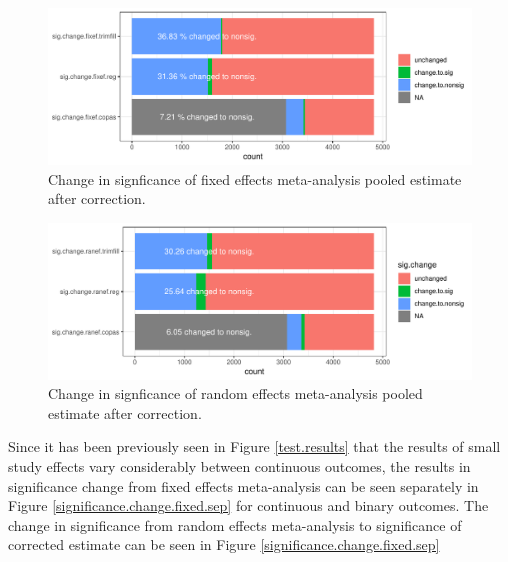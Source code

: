 \documentclass[11pt,a4paper,twoside]{book}\usepackage[]{graphicx}\usepackage[]{color}
\newenvironment{knitrout}{}{} %
\begin{document}
\begin{figure}
\begin{knitrout}
\color{fgcolor}

{\centering \includegraphics[width=\textwidth-3cm]{figure/ch02_figunnamed-chunk-27-1} 

}



\end{knitrout}
\caption{Change in signficance of fixed effects meta-analysis pooled estimate after correction.}
\label{significance.change.fixed}
\end{figure}

\begin{figure}
\begin{knitrout}
\color{fgcolor}

{\centering \includegraphics[width=\textwidth-3cm]{figure/ch02_figunnamed-chunk-28-1} 

}



\end{knitrout}
\caption{Change in signficance of random effects meta-analysis pooled estimate after correction.}
\label{significance.change.random}
\end{figure}

Since it has been previously seen in Figure \ref{test.results} that the results of small study effects vary considerably between continuous outcomes, the results in significance change from fixed effects meta-analysis can be seen separately in Figure \ref{significance.change.fixed.sep} for continuous and binary outcomes. The change in significance from random effects meta-analysis to significance of corrected estimate can be seen in Figure \ref{significance.change.fixed.sep}
\end{document}

